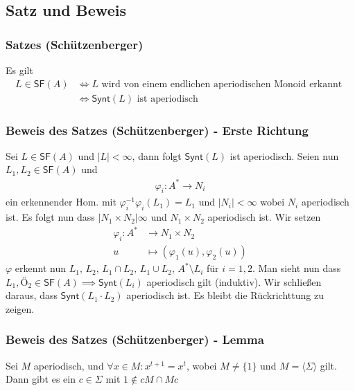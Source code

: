 \documentclass[12pt, german]{article}
\newcommand{\inv}{^{-1}}
\newcommand{\starfree}{\mathsf{SF}}
\newcommand{\synt}{\mathsf{Synt}}
\newcommand{\aast}{A^{\ast}}
\begin{document}
	\subsection{Satz und Beweis}
	\subsubsection{Satzes (Schützenberger)}
	Es gilt 
	\begin{align*}
		L \in \starfree(A) &\iff L \text{ wird von einem endlichen aperiodischen Monoid erkannt } \\ 
		&\iff \synt(L) \text{ ist aperiodisch }
	\end{align*}
	
	\subsubsection{Beweis des Satzes (Schützenberger) - Erste Richtung}
	Sei $L \in \starfree(A)$ und $|L| < \infty$, dann folgt $\synt(L)$ ist aperiodisch. Seien nun $L_1, L_2 \in \starfree(A)$ und 
	\begin{align*}
		\varphi_{i} : \aast \to N_i
	\end{align*} ein erkennender Hom. mit $\varphi_i\inv\varphi_{i}(L_1) = L_1$ und $|N_i| < \infty$ wobei $N_i$ aperiodisch ist.
	Es folgt nun dass $|N_1 \times N_2| \infty$ und $N_1 \times N_2$ aperiodisch ist. Wir setzen 
	\begin{align*}
		\varphi_{i}: \aast &\to N_1 \times N_2 \\
		u &\mapsto (\varphi_1(u), \varphi_2(u))
	\end{align*} $\varphi$ erkennt nun $L_1, \,L_2,  \, L_1 \cap L_2,   \,L_1 \cup L_2,  \, \aast \setminus L_i$ für $i = 1,2$.
	Man sieht nun dass $L_1, Ö_2 \in \starfree(A) \implies \synt(L_i)$ aperiodisch gilt (induktiv). Wir schließen daraus, dass $\synt(L_1 \cdot L_2)$ aperiodisch ist. 
	Es bleibt die Rückrichttung zu zeigen. 
	
	\subsubsection{Beweis des Satzes (Schützenberger) - Lemma \label{Lemma:Schütz}}
	Sei $M$ aperiodisch, und $\forall x \in M: x^{t+1} = x^t $, wobei $M \not = \{1\}$ und $M = \langle \Sigma \rangle$ gilt. 
	Dann gibt es ein $c \in \Sigma$ mit $1 \not \in cM \cap Mc$
	
\end{document}
